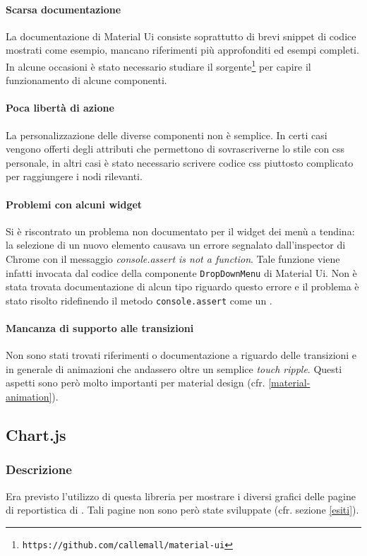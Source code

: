 \paragraph{Scarsa documentazione}
La documentazione di Material Ui consiste soprattutto
di brevi snippet di codice mostrati come esempio, mancano riferimenti più approfonditi ed
esempi completi. In alcune occasioni è stato necessario studiare il sorgente\footnote{\texttt{https://github.com/callemall/material-ui}} per capire il
funzionamento di alcune componenti.

\paragraph{Poca libertà di azione}
La personalizzazione delle diverse componenti non è
semplice. In certi casi vengono offerti degli attributi che permettono di sovrascriverne
lo stile con css personale, in altri casi è stato necessario scrivere codice css piuttosto
complicato per raggiungere i nodi rilevanti.

\paragraph{Problemi con alcuni widget}
Si è riscontrato un problema non documentato
per il widget dei menù a tendina: la selezione di un nuovo elemento causava un errore
segnalato dall'inspector di Chrome con il messaggio \textit{console.assert
is not a function}. Tale funzione viene infatti invocata dal codice della componente
\texttt{DropDownMenu} di Material Ui. Non è stata trovata documentazione di alcun tipo
riguardo questo errore e il problema è stato risolto ridefinendo il metodo
\texttt{console.assert} come un .

\paragraph{Mancanza di supporto alle transizioni}
Non sono stati trovati riferimenti
o documentazione a riguardo delle transizioni e in generale di animazioni che andassero
oltre un semplice \textit{touch ripple}. Questi aspetti sono però molto importanti per
material design (cfr. \ref{material-animation}).

\subsection{Chart.js}

\subsubsection{Descrizione}
Era previsto l'utilizzo di questa libreria per mostrare i diversi grafici delle pagine
di reportistica di \fiscoloMobile{}. Tali pagine non sono però state sviluppate (cfr.
sezione \ref{esiti}).

